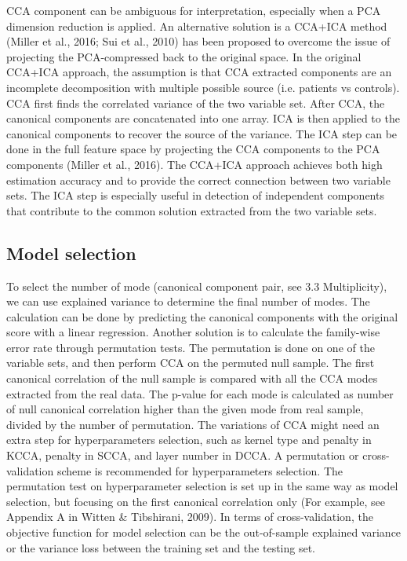 CCA component can be ambiguous for interpretation, especially when a PCA dimension reduction is applied. An alternative solution is a  CCA+ICA method (Miller et al., 2016; Sui et al., 2010) has been proposed to overcome the issue of projecting the PCA-compressed back to the original space. In the original CCA+ICA approach, the assumption is that CCA extracted components are an incomplete decomposition with multiple possible source (i.e. patients vs controls). CCA first finds the correlated variance of the two variable set. After CCA, the canonical components are concatenated into one array. ICA is then applied to the canonical components to recover the source of the variance. The ICA step can be done in the full feature space by projecting the CCA components to the PCA components (Miller et al., 2016). The CCA+ICA approach achieves both high estimation accuracy and to provide the correct connection between two variable sets. The ICA step is especially useful in detection of independent components that contribute to the common solution extracted from the two variable sets. 

\subsection{Model selection}
To select the number of mode (canonical component pair, see 3.3 Multiplicity), we can use explained variance to determine the final number of modes. The calculation can be done by predicting the canonical components with the original score with a linear regression. Another solution is to calculate the family-wise error rate through permutation tests.  The permutation is done on one of the variable sets, and then perform CCA on the permuted null sample. The first canonical correlation of the null sample is compared with all the CCA modes extracted from the real data. The p-value for each mode is calculated as number of null canonical correlation higher than the given mode from real sample, divided by  the number of permutation.
The variations of CCA might need an extra step for hyperparameters selection, such as kernel type and penalty in KCCA, penalty in SCCA, and layer number in DCCA. A permutation or cross-validation scheme is recommended for hyperparameters selection. The permutation test on hyperparameter selection is set up in the same way as model selection, but focusing on the first canonical correlation only (For example, see Appendix A in Witten \& Tibshirani, 2009). In terms of cross-validation, the objective function for model selection can be the out-of-sample explained variance or the variance loss between the training set and the testing set. 

